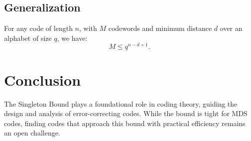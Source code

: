 \documentclass[12pt]{article}
\begin{document}
\subsection*{Generalization}
For any code of length \( n \), with \( M \) codewords and minimum distance \( d \) over an alphabet of size \( q \), we have:
\[
M \leq q^{n - d + 1}.
\]

\section*{Conclusion}
The Singleton Bound plays a foundational role in coding theory, guiding the design and analysis of error-correcting codes. While the bound is tight for MDS codes, finding codes that approach this bound with practical efficiency remains an open challenge.
\end{document}

